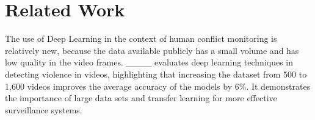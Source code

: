 \section{Related Work}



The use of Deep Learning in the context of human conflict monitoring is relatively new, because the data available publicly has a small volume and has low quality in the video frames.
____ evaluates deep learning techniques in detecting violence in videos, highlighting that increasing the dataset from 500 to 1,600 videos improves the average accuracy of the models by 6\%. It demonstrates the importance of large data sets and transfer learning for more effective surveillance systems.

